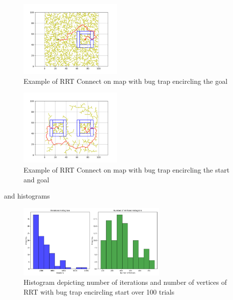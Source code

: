 \documentclass{article}
\begin{document}
\begin{figure}[H]
    \begin{center}
        \includegraphics[width=0.45\textwidth]{figures/final_path_RRT_Connect_4.png}
    \end{center}
    \caption{Example of RRT Connect on map with bug trap encircling the goal}\label{fig:RRT_Connect_4}
\end{figure}
\begin{figure}[H]
    \begin{center}
        \includegraphics[width=0.45\textwidth]{figures/final_path_RRT_Connect_5.png}
    \end{center}
    \caption{Example of RRT Connect on map with bug trap encircling the start and goal}\label{fig:RRT_Connect_5}
\end{figure}
and histograms
\begin{figure}[H]
    \begin{center}
        \includegraphics[width=0.65\textwidth]{figures/hist_RRT_3.png}
    \end{center}
    \caption{Histogram depicting number of iterations and number of
    vertices of RRT with bug trap encircling start over 100
trials}\label{fig:hist_RRT_3}
\end{figure}
\end{document}
